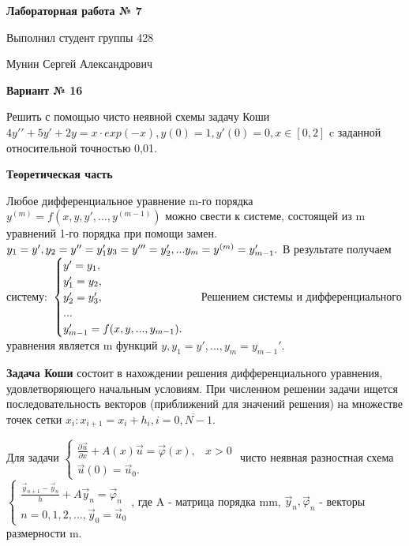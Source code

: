 \documentclass{article}
\begin{document}
\huge
\textbf{Лабораторная работа № 7}
\Large

Выполнил студент группы 428

Мунин Сергей Александрович

\LARGE
\textbf{Вариант № 16}

\Large
Решить с помощью чисто неявной схемы задачу Коши \(4y′′+ 5y′+ 2y=x·exp(−x),  y(0)=1,{y}'(0)=0,x\in [0,2]\)
c заданной относительной точностью 0,01.

\LARGE
\textbf{Теоретическая часть}

\Large
Любое дифференциальное уравнение  m-го порядка \(y^{(m)}=f(x,y,y',...,y^{(m-1)})\) можно свести к системе, состоящей из m уравнений 1-го порядка при помощи замен. 
\(\\y_{1}=y',\\
y_{2}=y''=y_{1}'\\
y_{3}=y'''=y_{2}',\\
...\\
y_{m}=y^{(m)}=y_{m-1}'.\\
\)
В результате получаем систему:
\(\\
\begin{cases}
 y'=y_{1}, \\ 
 y_{1}'=y_{2},\\ 
 y_{2}'=y_{3}', \\ 
 ... \\ 
 y_{m-1}'=f(x,y,...,y_{m-1}). 
\end{cases} \\ \)
Решением системы и дифференциального уравнения является m функций 
\(y, y_{1}=y',...,y_{m}=y_{m-1}'\).

\textbf{Задача Коши} состоит в нахождении решения дифференциального уравнения, удовлетворяющего начальным условиям. При численном решении задачи ищется последовательность векторов (приближений для значений решения) на множестве точек сетки \(x_{i}:x_{i+1}=x_{i}+h_{i}, i=\overline{0,N-1}. \)

Для задачи 
\( \begin{cases}
 \frac{\partial \vec{u}}{\partial x}+A(x)\vec{u}=\vec{\varphi} (x),& x>0 \\ 
 \vec{u}(0)=\vec{u}_{0}. 
\end{cases} \) чисто неявная разностная схема 
\(\begin{cases}
 \frac{\vec{y}_{n+1}-\vec{y}_{n}}{h}+A\vec{y}_{n}=\vec{\varphi}_{n}\\ 
n=0,1,2,..., \vec{y}_{0}=\vec{u}_{0} 
\end{cases} \), где A - матрица порядка m\times m, \(\vec{y}_{n},\vec{\varphi}_{n}\) - векторы размерности m.
\end{document}
